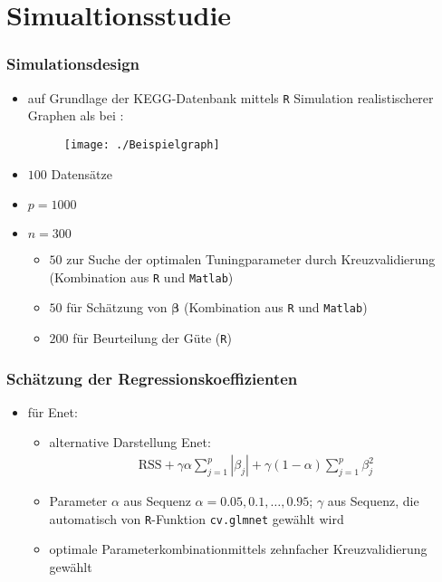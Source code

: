 \documentclass{beamer}
\begin{document}
\section{Simualtionsstudie}
\begin{frame}
	\frametitle{Simulationsdesign}
	\begin{itemize}
	\item auf Grundlage der KEGG-Datenbank mittels \texttt{R} Simulation realistischerer Graphen als bei \cite{kim_network-based_2013}:
	\begin{figure}
	\centering
	\texttt{[image: ./Beispielgraph]}
	\label{fig:beispiel}
	\end{figure}
	\item $100$ Datensätze
	\item $p=1000$
	\item $n=300$ 
	\begin{itemize}
	\item $50$ zur Suche der optimalen Tuningparameter durch Kreuzvalidierung (Kombination aus \texttt{R} und \texttt{Matlab})
	\item $50$ für Schätzung von $\boldsymbol{\beta}$ (Kombination aus \texttt{R} und \texttt{Matlab})
	\item $200$ für Beurteilung der Güte (\texttt{R})
	\end{itemize}
	\end{itemize}
\end{frame}

\begin{frame}
	\frametitle{Schätzung der Regressionskoeffizienten}
	\begin{itemize}
	\item für Enet:
	\begin{itemize}
	\item alternative Darstellung Enet:
	\begin{align*}
	\text{RSS}+\gamma \alpha \sum_{j=1}^{p}|\beta_j| + \gamma (1-\alpha) \sum_{j=1}^{p}\beta_j^2
	\end{align*}
	\item Parameter $\alpha$ aus Sequenz $\alpha={0.05, 0.1, \dots ,0.95}$; $\gamma$ aus Sequenz, die automatisch von \texttt{R}-Funktion \texttt{cv.glmnet} gewählt wird 
	\item optimale Parameterkombinationmittels zehnfacher Kreuzvalidierung gewählt
	\end{itemize}
	\end{itemize}
\end{frame}
\end{document}
